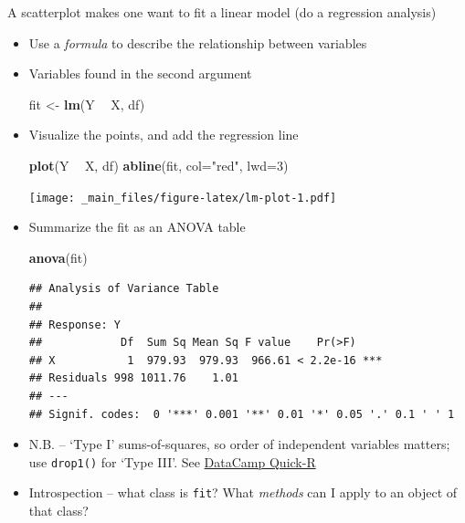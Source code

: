 \documentclass[]{article}
\newenvironment{Shaded}{\begin{snugshade}}{\end{snugshade}}
\newcommand{\KeywordTok}[1]{\textcolor[rgb]{0.13,0.29,0.53}{\textbf{#1}}}
\newcommand{\DataTypeTok}[1]{\textcolor[rgb]{0.13,0.29,0.53}{#1}}
\newcommand{\DecValTok}[1]{\textcolor[rgb]{0.00,0.00,0.81}{#1}}
\newcommand{\StringTok}[1]{\textcolor[rgb]{0.31,0.60,0.02}{#1}}
\newcommand{\OperatorTok}[1]{\textcolor[rgb]{0.81,0.36,0.00}{\textbf{#1}}}
\newcommand{\NormalTok}[1]{#1}
\theoremstyle{definition}
\theoremstyle{definition}
\theoremstyle{remark}
\begin{document}
A scatterplot makes one want to fit a linear model (do a regression
analysis)

\begin{itemize}
\item
  Use a \emph{formula} to describe the relationship between variables
\item
  Variables found in the second argument

\begin{Shaded}
\begin{Highlighting}[]
\NormalTok{fit <-}\StringTok{ }\KeywordTok{lm}\NormalTok{(Y }\OperatorTok{~}\StringTok{ }\NormalTok{X, df)}
\end{Highlighting}
\end{Shaded}
\item
  Visualize the points, and add the regression line

\begin{Shaded}
\begin{Highlighting}[]
\KeywordTok{plot}\NormalTok{(Y }\OperatorTok{~}\StringTok{ }\NormalTok{X, df)}
\KeywordTok{abline}\NormalTok{(fit, }\DataTypeTok{col=}\StringTok{"red"}\NormalTok{, }\DataTypeTok{lwd=}\DecValTok{3}\NormalTok{)}
\end{Highlighting}
\end{Shaded}

  \texttt{[image: \_main\_files/figure-latex/lm-plot-1.pdf]}
\item
  Summarize the fit as an ANOVA table

\begin{Shaded}
\begin{Highlighting}[]
\KeywordTok{anova}\NormalTok{(fit)}
\end{Highlighting}
\end{Shaded}

\begin{verbatim}
## Analysis of Variance Table
## 
## Response: Y
##            Df  Sum Sq Mean Sq F value    Pr(>F)    
## X           1  979.93  979.93  966.61 < 2.2e-16 ***
## Residuals 998 1011.76    1.01                      
## ---
## Signif. codes:  0 '***' 0.001 '**' 0.01 '*' 0.05 '.' 0.1 ' ' 1
\end{verbatim}
\item
  N.B. -- `Type I' sums-of-squares, so order of independent variables
  matters; use \texttt{drop1()} for `Type III'. See
  \href{http://www.statmethods.net/stats/anova.html}{DataCamp Quick-R}
\item
  Introspection -- what class is \texttt{fit}? What \emph{methods} can I
  apply to an object of that class?


\end{itemize}
\end{document}
